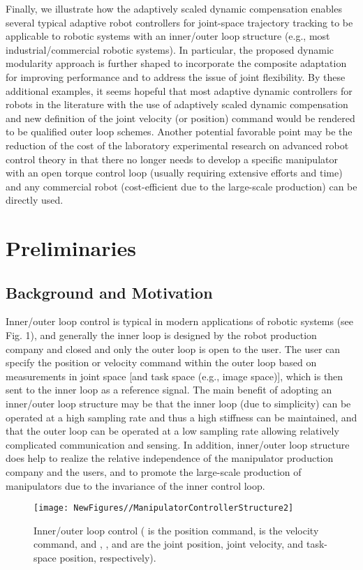 \documentclass[9pt,technote]{IEEEtran}
\begin{document}
Finally, we illustrate how the adaptively scaled dynamic compensation enables several typical adaptive robot controllers for {joint-space trajectory tracking} to be applicable to robotic systems with an inner/outer loop structure (e.g., most industrial/commercial robotic systems). In particular, the proposed dynamic modularity approach is further shaped to incorporate the composite adaptation for improving performance and to address the issue of joint flexibility. By these additional examples, it seems hopeful that most adaptive dynamic controllers for robots in the literature with the use of adaptively scaled dynamic compensation and new definition of the joint velocity (or position) command would be rendered to be qualified outer loop schemes. {Another potential favorable point may be the reduction of the cost of the laboratory experimental research on advanced robot control theory in that there no longer needs to develop a specific manipulator with an open torque control loop (usually requiring extensive efforts and time) and any commercial robot (cost-efficient due to the large-scale production) can be directly used}.


\section{Preliminaries}

\subsection{Background and Motivation}

Inner/outer loop control is typical in modern applications of robotic systems (see Fig. 1), and generally the inner loop is designed by the robot production company and closed and only the outer loop is open to the user. The user can specify the position or velocity command within the outer loop based on measurements in joint space [and task space (e.g., image space)], which is then sent to the inner loop as a reference signal. The main benefit of adopting an inner/outer loop structure may be that the inner loop (due to simplicity) can be operated at a high sampling rate and thus a high stiffness can be maintained, and that the outer loop can be operated at a low sampling rate allowing relatively complicated communication and sensing. In addition, inner/outer loop structure does help to realize the relative independence of the manipulator production company and the users, and to promote the large-scale production of manipulators due to the invariance of the inner control loop.
\begin{figure}
\centering
\begin{minipage}[t]{1.0\linewidth}
\centering
\texttt{[image: NewFigures//ManipulatorControllerStructure2]}
\caption{Inner/outer loop control ( is the position command,  is the velocity command, and , , and  are the joint position, joint velocity, and task-space position, respectively).}\label{fig:side:a}
\end{minipage}\end{figure}
\end{document}
